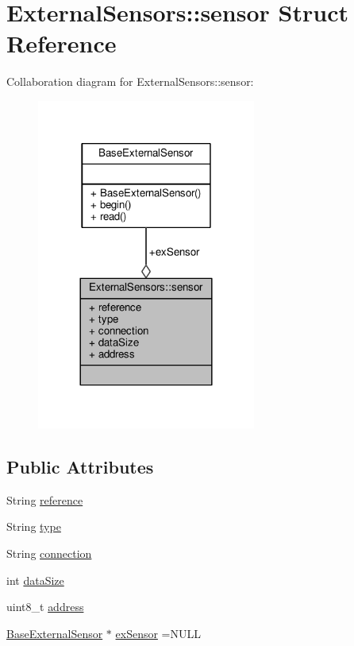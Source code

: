 \hypertarget{structExternalSensors_1_1sensor}{}\section{External\+Sensors\+:\+:sensor Struct Reference}
\label{structExternalSensors_1_1sensor}


Collaboration diagram for External\+Sensors\+:\+:sensor\+:
\nopagebreak
\begin{figure}[H]
\begin{center}
\leavevmode
\includegraphics[width=204pt]{structExternalSensors_1_1sensor__coll__graph}
\end{center}
\end{figure}
\subsection*{Public Attributes}
\begin{DoxyCompactItemize}
\item 
String \hyperlink{structExternalSensors_1_1sensor_afed5bdfd49732202a368b600cb8396fe}{reference}
\item 
String \hyperlink{structExternalSensors_1_1sensor_a6acfdb02c742c2110d7bd2b5d9fce9e7}{type}
\item 
String \hyperlink{structExternalSensors_1_1sensor_ae3c8c1da809f2238bc9abde37a6c6022}{connection}
\item 
int \hyperlink{structExternalSensors_1_1sensor_ae9c669bb93befbe4b333920e7f357b80}{data\+Size}
\item 
uint8\+\_\+t \hyperlink{structExternalSensors_1_1sensor_a8d70ca58524521ed054fc6b81eb58d34}{address}
\item 
\hyperlink{classBaseExternalSensor}{Base\+External\+Sensor} $\ast$ \hyperlink{structExternalSensors_1_1sensor_a9bca150fd468b8d0e090e6d72c5c2b48}{ex\+Sensor} =N\+U\+LL
\end{DoxyCompactItemize}


